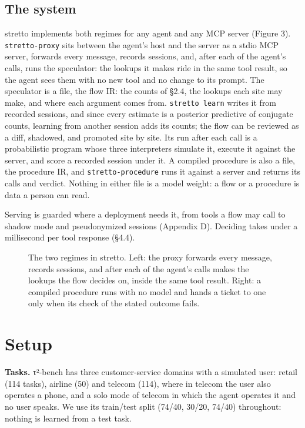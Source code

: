 \documentclass[10pt,twocolumn,letterpaper]{article}
\newcommand{\runin}[1]{{\sffamily\bfseries\color{accent}#1}}
\begin{document}
\hypertarget{the-system}{%
\subsection{The system}\label{the-system}}

stretto implements both regimes for any agent and any MCP server (Figure 3). \texttt{stretto-proxy} sits between the agent's host and the server as a stdio MCP server, forwards every message, records sessions, and, after each of the agent's calls, runs the speculator: the lookups it makes ride in the same tool result, so the agent sees them with no new tool and no change to its prompt. The speculator is a file, the flow IR: the counts of §2.4, the lookups each site may make, and where each argument comes from. \texttt{stretto\ learn} writes it from recorded sessions, and since every estimate is a posterior predictive of conjugate counts, learning from another session adds its counts; the flow can be reviewed as a diff, shadowed, and promoted site by site. Its run after each call is a probabilistic program \citep{nodeland2026fugue} whose three interpreters simulate it, execute it against the server, and score a recorded session under it. A compiled procedure is also a file, the procedure IR, and \texttt{stretto-procedure} runs it against a server and returns its calls and verdict. Nothing in either file is a model weight: a flow or a procedure is data a person can read.

Serving is guarded where a deployment needs it, from tools a flow may call to shadow mode and pseudonymized sessions (Appendix D). Deciding takes under a millisecond per tool response (§4.4).

\begin{figure}[tp]
\centering
{}
\caption{The two regimes in stretto. Left: the proxy forwards every message, records sessions, and after each of the agent's calls makes the lookups the flow decides on, inside the same tool result. Right: a compiled procedure runs with no model and hands a ticket to one only when its check of the stated outcome fails.}
\label{fig:regimes}
\end{figure}

\hypertarget{setup}{%
\section{Setup}\label{setup}}

\runin{Tasks.} τ²-bench \citep{barres2025tau2} has three customer-service domains with a simulated user: retail (114 tasks), airline (50) and telecom (114), where in telecom the user also operates a phone, and a solo mode of telecom in which the agent operates it and no user speaks. We use its train/test split (74/40, 30/20, 74/40) throughout: nothing is learned from a test task.
\end{document}
